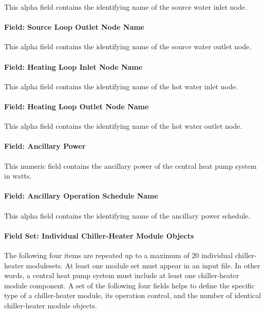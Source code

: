 This alpha field contains the identifying name of the source water inlet node.

\paragraph{Field: Source Loop Outlet Node Name}\label{field-source-loop-outlet-node-name}

This alpha field contains the identifying name of the source water outlet node.

\paragraph{Field: Heating Loop Inlet Node Name}\label{field-heating-loop-inlet-node-name}

This alpha field contains the identifying name of the hot water inlet node.

\paragraph{Field: Heating Loop Outlet Node Name}\label{field-heating-loop-outlet-node-name}

This alpha field contains the identifying name of the hot water outlet node.

\paragraph{Field: Ancillary Power}\label{field-ancillary-power-000}

This numeric field contains the ancillary power of the central heat pump system in watts.

\paragraph{Field: Ancillary Operation Schedule Name}\label{field-ancillary-operation-schedule-name}

This alpha field contains the identifying name of the ancillary power schedule.

\paragraph{Field Set: Individual Chiller-Heater Module Objects}\label{field-set-individual-chiller-heater-module-objects}

The following four items are repeated up to a maximum of 20 individual chiller-heater modulesets. At least one module set must appear in an input file. In other words, a central heat pump system must include at least one chiller-heater module component. A set of the following four fields helps to define the specific type of a chiller-heater module, its operation control, and the number of identical chiller-heater module objects.


